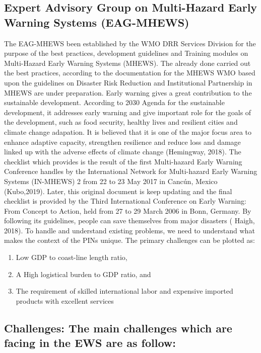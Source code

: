 \subsection{Expert Advisory Group on Multi-Hazard Early Warning Systems (EAG-MHEWS)}
The EAG-MHEWS been established by the WMO DRR Services Division for the purpose of the best practices, development guidelines and Training modules on Multi-Hazard Early Warning Systems (MHEWS). The already done carried out the best practices, according to the documentation for the MHEWS WMO based upon the guidelines on Disaster Risk Reduction and Institutional Partnership in MHEWS are under preparation. 
 Early warning gives a great contribution to the sustainable development. According to 2030 Agenda for the sustainable development, it addresses  early warning and give important role for the goals of the development, such as food security, healthy lives and resilient cities and climate change adapation. It is believed that it is one of the major focus area to enhance adaptive capacity, strengthen resilience and reduce loss and damage linked up with the adverse effects of climate change (Hemingway, 2018).
The checklist which provides is the result of the first Multi-hazard Early Warning Conference handles by the International Network for Multi-hazard Early Warning Systems (IN-MHEWS) 2 from 22 to 23 May 2017 in Cancún, Mexico (Kubo,2019). Later, this original document is keep updating and the final checklist is provided by the  Third International Conference on Early Warning: From Concept to Action, held from 27 to 29 March 2006 in Bonn, Germany.  By following its guidelines, people can save themselves from major disasters ( Haigh, 2018).
To  handle and understand existing problems, we need to understand what makes the context of the PINs unique. The primary challenges  can be plotted as:
 
\begin{enumerate}
\item Low GDP to coast-line length ratio, 
\item A High logistical burden to GDP ratio, and 
\item The requirement of skilled international labor and expensive imported products with excellent services
\end{enumerate}

 
\subsection{Challenges: The main challenges which are facing in the EWS are as follow:}

